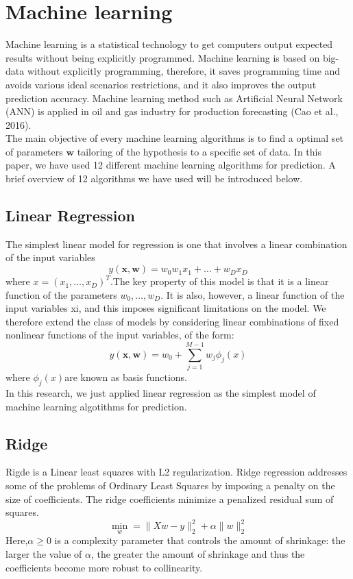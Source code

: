 \documentclass[12pt,a4paper]{report}
\begin{document}
\section{Machine learning}
Machine learning is a statistical technology to get computers output expected results without being explicitly programmed. Machine learning is based on big-data without explicitly programming, therefore, it saves programming time and avoids various ideal scenarios restrictions, and it also improves the output prediction accuracy. Machine learning method such as Artificial Neural Network (ANN) is applied in oil and gas industry for production forecasting \cite{Cao}(Cao et al., 2016).\\
The main objective of every machine learning algorithms is to find a optimal set of parameters $\textbf{w}$ tailoring of the hypothesis to a specific set of data.
In this paper, we have used 12 different machine learning algorithms for prediction. A brief overview of 12 algorithms we have used will be introduced below.

\subsection{Linear Regression}
The simplest linear model for regression is one that involves a linear combination of
the input variables\cite{Bishop}
\begin{equation}
y(\textbf{x}, \textbf{w}) = w_{0} w_{1}x_{1} + \ldots + w_{D}x_{D} 
\end{equation}
where $x = (x_{1},\ldots,x_{D})^{T}$.The key property of this model is that it is a linear function of the parameters $w_{0} , \ldots, w_{D}$. It is also, however, a linear function of the input variables xi, and this imposes significant limitations on the model. We therefore extend the class of models by considering linear combinations of fixed nonlinear functions of the input variables, of the form:
\begin{equation}
y(\textbf{x}, \textbf{w}) =  w_{0} + \sum_{j=1}^{M-1} w_{j}\phi_{j}(x)
\end{equation}
where $\phi_{j} (x)$are known as basis functions.\\
In this research, we just applied linear regression as the simplest model of machine learning algotithms for prediction.

\subsection{Ridge}
Rigde is a Linear least squares with L2 regularization. Ridge regression addresses some of the problems of Ordinary Least Squares by imposing a penalty on the size of coefficients. The ridge coefficients minimize a penalized residual sum of squares.\cite{sklearn}
\begin{equation}
\min_{w} = \parallel Xw - y \parallel_{2}^2 +\alpha\parallel w \parallel_{2}^2
\end{equation}
Here,$\alpha \ge 0 $ is a complexity parameter that controls the amount of shrinkage: the larger the value of $\alpha$, the greater the amount of shrinkage and thus the coefficients become more robust to collinearity.
\end{document}
